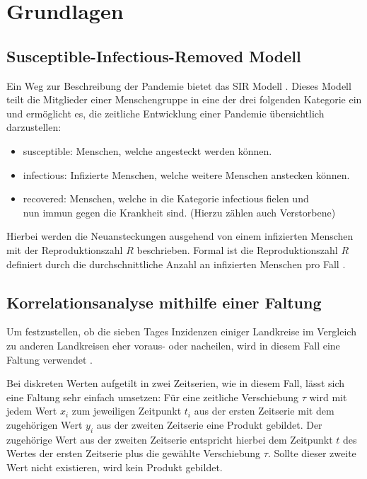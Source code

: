 \chapter{Grundlagen}\label{chap:Grundlagen}
\section{Susceptible-Infectious-Removed Modell}
Ein Weg zur Beschreibung der Pandemie bietet das SIR Modell \autocite{SIR}. Dieses Modell teilt die Mitglieder einer Menschengruppe in eine der drei folgenden Kategorie ein und ermöglicht es, die zeitliche Entwicklung einer Pandemie übersichtlich darzustellen:
\begin{itemize}
    \item \glqq{}susceptible\grqq{}: Menschen, welche angesteckt werden können.
    \item \glqq{}infectious\grqq{}: Infizierte Menschen, welche weitere Menschen anstecken können.
    \item \glqq{}recovered\grqq{}: Menschen, welche in die Kategorie \glqq{}infectious\grqq{} fielen und\\
    nun immun gegen die Krankheit sind. (Hierzu zählen auch Verstorbene)
\end{itemize}
Hierbei werden die Neuansteckungen ausgehend von einem infizierten Menschen mit der Reproduktionszahl $R$ beschrieben. Formal ist die Reproduktionszahl $R$ definiert durch die durchschnittliche Anzahl an infizierten Menschen pro Fall \autocite{ReZahl}.


\section{Korrelationsanalyse mithilfe einer Faltung}\label{sec:Korrelationsanalyse}
Um festzustellen, ob die sieben Tages Inzidenzen einiger Landkreise im Vergleich zu anderen Landkreisen eher voraus- oder nacheilen, wird in diesem Fall eine \glqq{}Faltung\grqq{} verwendet \autocite{Korrelation}.

Bei diskreten Werten aufgetilt in zwei Zeitserien, wie in diesem Fall, lässt sich eine Faltung sehr einfach umsetzen:
Für eine zeitliche Verschiebung $\tau$ wird mit jedem Wert $x_i$ zum jeweiligen Zeitpunkt $t_i$ aus der ersten Zeitserie mit dem zugehörigen Wert $y_i$ aus der zweiten Zeitserie eine Produkt gebildet. Der zugehörige Wert aus der zweiten Zeitserie entspricht hierbei dem Zeitpunkt $t$ des Wertes der ersten Zeitserie plus die gewählte Verschiebung $\tau$. Sollte dieser zweite Wert nicht existieren, wird kein Produkt gebildet.

